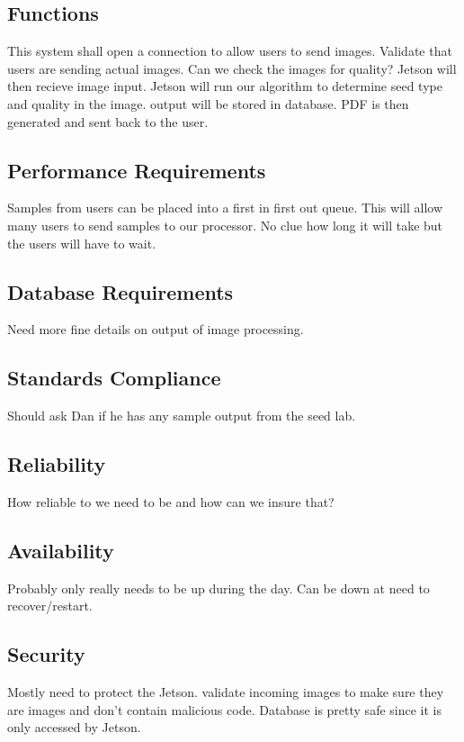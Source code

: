\documentclass[onecolumn, draftclsnofoot,10pt, compsoc]{IEEEtran}
\begin{document}
\subsection{Functions}
This system shall open a connection to allow users to send images.
Validate that users are sending actual images.
Can we check the images for quality?
Jetson will then recieve image input.
Jetson will run our algorithm to determine seed type and quality in the image.
output will be stored in database.
PDF is then generated and sent back to the user.

\subsection{Performance Requirements}
Samples from users can be placed into a first in first out queue.
This will allow many users to send samples to our processor.
No clue how long it will take but the users will have to wait.

\subsection{Database Requirements}
Need more fine details on output of image processing.

\subsection{Standards Compliance}
Should ask Dan if he has any sample output from the seed lab.

\subsection{Reliability}
How reliable to we need to be and how can we insure that?

\subsection{Availability}
Probably only really needs to be up during the day.
Can be down at need to recover/restart.

\subsection{Security}
Mostly need to protect the Jetson.
validate incoming images to make sure they are images and don't contain malicious code.
Database is pretty safe since it is only accessed by Jetson.
\end{document}
